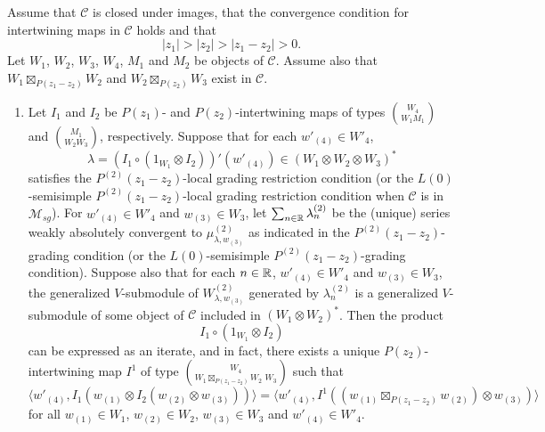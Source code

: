 \documentclass[12pt]{article}
\begin{document}
\setcounter{rema}{22}
\begin{theo}
Assume that $\mathcal{C}$ is closed under images, that the convergence
condition for intertwining maps in $\mathcal{C}$ holds and that
\[
|z_1|>|z_2|>|z_{1}-z_{2}|>0.
\]
Let $W_{1}$, $W_{2}$, $W_{3}$, $W_{4}$, $M_{1}$ and $M_{2}$ be objects
of $\mathcal{C}$.  Assume also that $W_1\boxtimes_{P(z_{1}-z_{2})} W_2$ and
$W_2\boxtimes_{P(z_2)} W_3$ exist in $\mathcal{C}$.

\begin{enumerate}

\item  Let
$I_{1}$ and $I_{2}$ be $P(z_1)$- and $P(z_2)$-intertwining maps of 
types ${W_4}\choose {W_1M_1}$ and
${M_1}\choose {W_2W_3}$, respectively. 
Suppose that for each $w'_{(4)} \in W'_{4}$,
\[
\lambda=(I_1\circ (1_{W_1}\otimes I_2))'(w'_{(4)}) \in
(W_{1}\otimes W_{2} \otimes W_{3})^{*}
\]
satisfies the $P^{(2)}(z_{1}-z_{2})$-local grading restriction condition (or
the  $L(0)$-semisimple $P^{(2)}(z_{1}-z_{2})$-local grading restriction
condition when $\mathcal{C}$ is in $\mathcal{M}_{sg}$). For
$w'_{(4)}\in W'_{4}$ and $w_{(3)}\in W_{3}$, let $\sum_{n\in
\mathbb{R}}\lambda_{n}^{(2)}$ be the (unique) series weakly absolutely convergent to
$\mu^{(2)}_{\lambda, w_{(3)}}$ as indicated in the
$P^{(2)}(z_{1}-z_{2})$-grading condition (or the $L(0)$-semisimple
$P^{(2)}(z_{1}-z_{2})$-grading condition).  Suppose also that for each $n \in
\mathbb{R}$, $w'_{(4)} \in W'_4$ and $w_{(3)} \in W_3$, the generalized
$V$-submodule of $W^{(2)}_{\lambda, w_{(3)}}$ generated by
$\lambda_{n}^{(2)}$ is a generalized $V$-submodule of some object of
$\mathcal{C}$ included in $(W_1 \otimes W_2)^*$.  Then the product
\[
I_1\circ (1_{W_1}\otimes I_2)
\]
can be expressed as an
iterate, and in fact, there exists a unique
$P(z_2)$-intertwining map $I^{1}$ of type ${W_4\choose
W_1\boxtimes_{P(z_{1}-z_{2})} W_2\,\,W_3}$ such that
\[
\langle w'_{(4)},I_1(w_{(1)} \otimes I_2(w_{(2)} \otimes w_{(3)}))\rangle
=\langle w'_{(4)}, I^{1}((w_{(1)}\boxtimes_{P(z_{1}-z_{2})} w_{(2)})\otimes 
w_{(3)})\rangle
\]
for all $w_{(1)}\in W_1$, $w_{(2)}\in W_2$, $w_{(3)}\in W_3$ and
$w'_{(4)}\in W'_4$.


\end{enumerate}
\end{theo}
\end{document}

